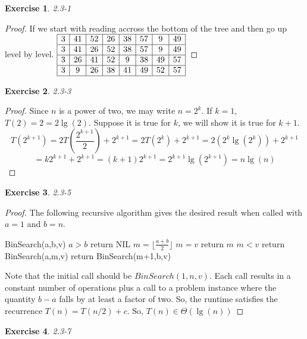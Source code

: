 \documentclass{article}
\newtheorem{th1}{Exercise}
\begin{document}
\begin{th1}\label{ex5}
2.3-1
\end{th1}
\begin{proof}
If we start with reading accross the bottom of the tree and then go up level by level.
$
\begin{array}{|c|c|c|c|c|c|c|c|}
\hline
3&41&52&26&38&57&9&49\\
\hline
3&41&26&52&38&57&9&49\\
\hline
3&26&41&52&9&38&49&57\\
\hline
3&9&26&38&41&49&52&57\\
\hline
\end{array}
$
\end{proof}
\begin{th1}\label{ex6}
2.3-3
\end{th1}
\begin{proof}
Since $n$ is a power of two, we may write $n= 2^k$. If $k=1$, $T(2) = 2 = 2\lg(2)$. Suppose it is true for $k$, we will show it is true for $k+1$.
\[
T(2^{k+1}) = 2T\left(\frac{2^{k+1}}{2}\right) + 2^{k+1} = 2T\left(2^{k}\right) + 2^{k+1} = 2(2^k\lg(2^k)) + 2^{k+1} \]\[= k2^{k+1}+ 2^{k+1} = (k+1)2^{k+1} = 2^{k+1} \lg(2^{k+1}) = n\lg(n)
\]
\end{proof}
\begin{th1}\label{ex7}
2.3-5
\end{th1}
\begin{proof}
The following recursive algorithm gives the desired result when called with $a=1$ and $b=n$.

\begin{algorithm}\begin{algorithmic}[1]
\State BinSearch(a,b,v)
\If $a>b$
\State return NIL
\EndIf
\State $m = \lfloor \frac{a+b}{2}\rfloor$
\If $m=v$
\State return $m$
\EndIf
\If $m<v$
\State return BinSearch(a,m,v)
\EndIf
\State return BinSearch(m+1,b,v)
\end{algorithmic}
\end{algorithm}
Note that the initial call should be $BinSearch(1,n,v)$. Each call results in a constant number of operations plus a call to a problem instance where the quantity $b-a$ falls by at least a factor of two. So, the runtime satisfies the recurrence $T(n)= T(n/2)+c$. So, $T(n)\in\Theta(\lg(n))$
\end{proof}
\begin{th1}\label{ex8}
2.3-7
\end{th1}
\end{document}
